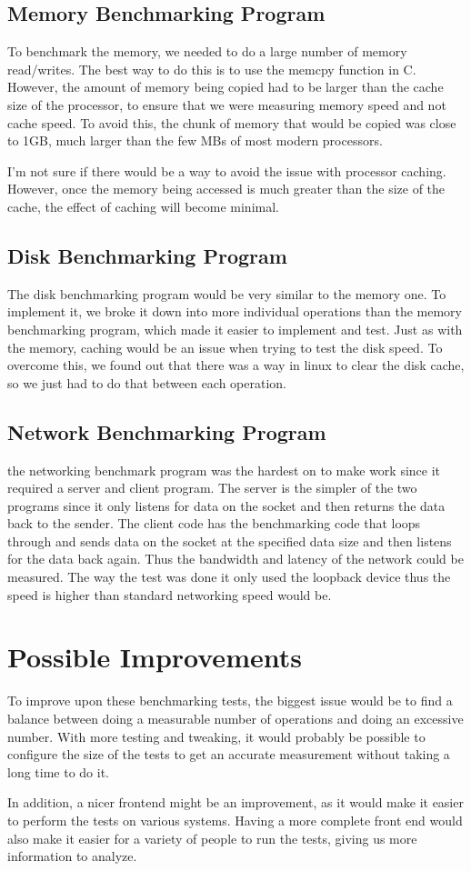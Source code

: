 \documentclass{article}
\begin{document}
\subsection{Memory Benchmarking Program}
To benchmark the memory, we needed to do a large number of memory read/writes.  The best way to do this is to use the memcpy function in C.  However, the amount of memory being copied had to be larger than the cache size of the processor, to ensure that we were measuring memory speed and not cache speed.  To avoid this, the chunk of memory that would be copied was close to 1GB, much larger than the few MBs of most modern processors.

I'm not sure if there would be a way to avoid the issue with processor caching.  However, once the memory being accessed is much greater than the size of the cache, the effect of caching will become minimal.

\subsection{Disk Benchmarking Program}
The disk benchmarking program would be very similar to the memory one.  To implement it, we broke it down into more individual operations than the memory benchmarking program, which made it easier to implement and test.  Just as with the memory, caching would be an issue when trying to test the disk speed.  To overcome this, we found out that there was a way in linux to clear the disk cache, so we just had to do that between each operation.

\subsection{Network Benchmarking Program}
the networking benchmark program was the hardest on to make work since it required a server and client program. The server is the simpler of the two programs since it only listens for data on the socket and then returns the data back to the sender. The client code has the benchmarking code that loops through and sends data on the socket at the specified data size and then listens for the data back again. Thus the bandwidth and latency of the network could be measured. The way the test was done it only used the loopback device thus the speed is higher than standard networking speed would be. 

\section{Possible Improvements}
To improve upon these benchmarking tests, the biggest issue would be to find a balance between doing a measurable number of operations and doing an excessive number.  With more testing and tweaking, it would probably be possible to configure the size of the tests to get an accurate measurement without taking a long time to do it.

In addition, a nicer frontend might be an improvement, as it would make it easier to perform the tests on various systems.  Having a more complete front end would also make it easier for a variety of people to run the tests, giving us more information to analyze.
\end{document}
